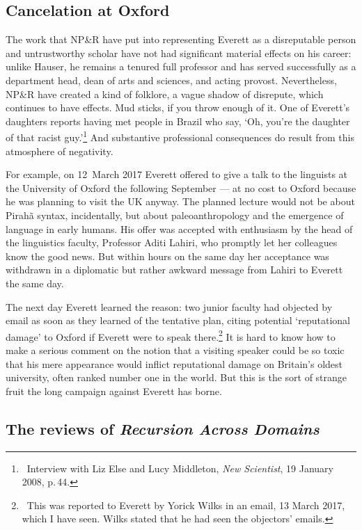 \documentclass[output=paper,colorlinks,citecolor=brown
]{langscibook}
\begin{document}
\subsection{Cancelation at Oxford}

The work that NP\&R have put into representing Everett as a disreputable
person and untrustworthy scholar have not had significant material effects
on his career: unlike Hauser, he remains a tenured full professor and has
served successfully as a department head, dean of arts and sciences, and
acting provost. Nevertheless, NP\&R have created a kind of folklore, a
vague shadow of disrepute, which continues to have effects. Mud sticks,
if you throw enough of it. One of Everett's daughters reports having met
people in Brazil who say, `Oh, you're the daughter of that racist
guy.'\footnote{\,
   Interview with Liz Else and Lucy Middleton, \textit{New Scientist},
   19 January 2008, p.\,44.}
And substantive professional consequences do result from this atmosphere
of negativity.

For example, on 12~March 2017 Everett offered to give a talk to the
linguists at the University of Oxford the following September --- at
no cost to Oxford because he was planning to visit the UK anyway. The
planned lecture would not be about Pirah{\~a} syntax, incidentally,
but about paleoanthropology and the emergence of language in early
humans. His offer was accepted with enthusiasm by the head of the
linguistics faculty, Professor Aditi Lahiri, who promptly let her
colleagues know the good news. But within hours on the same day her
acceptance was withdrawn in a diplomatic but rather awkward message
from Lahiri to Everett the same day.

The next day Everett learned the reason: two junior faculty had
objected by email as soon as they learned of the tentative plan,
citing potential `reputational damage' to Oxford if Everett were to
speak there.\footnote{\,
   This was reported to Everett by Yorick Wilks in an email,
   13 March 2017, which I have seen. Wilks stated that he had seen
   the objectors' emails.}
It is hard to know how to make a serious comment on the notion that
a visiting speaker could be so toxic that his mere appearance would
inflict reputational damage on Britain's oldest university, often
ranked number one in the world. But this is the sort of strange fruit
the long campaign against Everett has borne.

\subsection{The reviews of \textit{Recursion Across Domains}}
\end{document}
